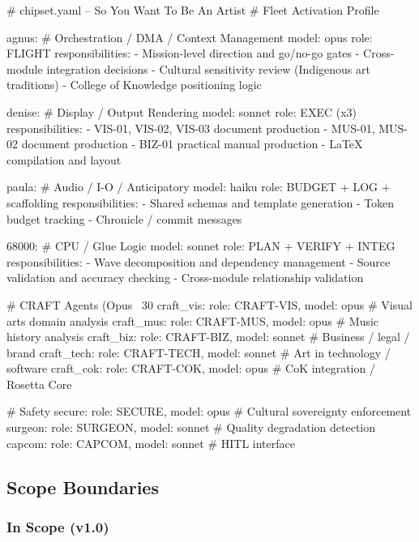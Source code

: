 \documentclass[11pt,letterpaper]{article}
\begin{document}
\begin{asciibox}
# chipset.yaml -- So You Want To Be An Artist
# Fleet Activation Profile

agnus:           # Orchestration / DMA / Context Management
  model: opus
  role: FLIGHT
  responsibilities:
    - Mission-level direction and go/no-go gates
    - Cross-module integration decisions
    - Cultural sensitivity review (Indigenous art traditions)
    - College of Knowledge positioning logic

denise:          # Display / Output Rendering
  model: sonnet
  role: EXEC (x3)
  responsibilities:
    - VIS-01, VIS-02, VIS-03 document production
    - MUS-01, MUS-02 document production
    - BIZ-01 practical manual production
    - LaTeX compilation and layout

paula:           # Audio / I-O / Anticipatory
  model: haiku
  role: BUDGET + LOG + scaffolding
  responsibilities:
    - Shared schemas and template generation
    - Token budget tracking
    - Chronicle / commit messages

68000:           # CPU / Glue Logic
  model: sonnet
  role: PLAN + VERIFY + INTEG
  responsibilities:
    - Wave decomposition and dependency management
    - Source validation and accuracy checking
    - Cross-module relationship validation

# CRAFT Agents (Opus ~30%
craft_vis:   {role: CRAFT-VIS, model: opus}    # Visual arts domain analysis
craft_mus:   {role: CRAFT-MUS, model: opus}    # Music history analysis
craft_biz:   {role: CRAFT-BIZ, model: sonnet}  # Business / legal / brand
craft_tech:  {role: CRAFT-TECH, model: sonnet} # Art in technology / software
craft_cok:   {role: CRAFT-COK, model: opus}    # CoK integration / Rosetta Core

# Safety
secure:  {role: SECURE, model: opus}  # Cultural sovereignty enforcement
surgeon: {role: SURGEON, model: sonnet} # Quality degradation detection
capcom:  {role: CAPCOM, model: sonnet}  # HITL interface
\end{asciibox}

\subsection{Scope Boundaries}

\subsubsection*{In Scope (v1.0)}
\end{document}
